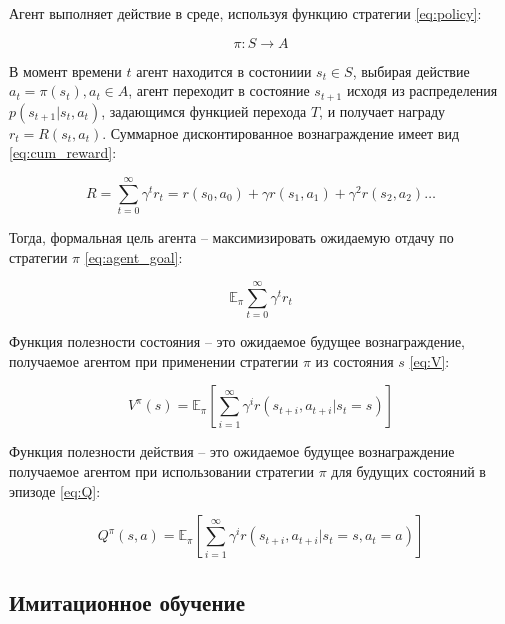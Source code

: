         Агент выполняет действие в среде, используя функцию стратегии \ref{eq:policy}: 

        \begin{equation}
            \pi: S \to A
            \label{eq:policy}
        \end{equation}

        В момент времени $t$ агент находится в состониии $s_t \in S$, выбирая действие $a_t = \pi(s_t), a_t \in A$, агент переходит в состояние $s_{t + 1}$ исходя из распределения $p(s_{t + 1} | s_t, a_t)$, задающимся функцией перехода $T$, и получает награду $r_t = R(s_t, a_t)$. Суммарное дисконтированное вознаграждение имеет вид \ref{eq:cum_reward}: 

        \begin{equation}
            R = \sum_{t = 0}^\infty  \gamma^t r_t = r(s_0, a_0) + \gamma r(s_1, a_1) + \gamma^2 r(s_2, a_2) \dots
            \label{eq:cum_reward}
        \end{equation}

        Тогда, формальная цель агента -- максимизировать ожидаемую отдачу по стратегии $\pi$ \ref{eq:agent_goal}:

        \begin{equation}
            \mathbb{E}_{\pi} \sum_{t = 0}^\infty \gamma^t r_t
            \label{eq:agent_goal}
        \end{equation}

        Функция полезности состояния -- это ожидаемое будущее вознаграждение, получаемое агентом при применении стратегии $\pi$ из состояния $s$ \ref{eq:V}:

        \begin{equation}
            V^{\pi} (s) = \mathbb{E}_{\pi} \left[ \sum_{i = 1}^{\infty} \gamma^i r(s_{t + i}, a_{t + i} | s_t = s) \right]
            \label{eq:V}
        \end{equation}

        Функция полезности действия -- это ожидаемое будущее вознаграждение получаемое агентом при использовании стратегии $\pi$ для будущих состояний в эпизоде \ref{eq:Q}:

        \begin{equation}
            Q^{\pi} (s, a) = \mathbb{E}_{\pi} \left[ \sum_{i = 1}^{\infty} \gamma^i r(s_{t + i}, a_{t + i} | s_t = s, a_t = a) \right]
            \label{eq:Q}
        \end{equation}

        
    \subsection{Имитационное обучение}

